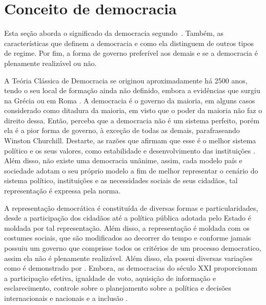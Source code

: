 \section{Conceito de democracia} \label{democracia}


Esta seção aborda o significado da democracia segundo~\cite{robertdahl2001}.
Também, as características que definem a democracia e como ela distinguem de outros tipos de regime. 
Por fim, a forma de governo preferível aos demais e se a democracia é plenamente realizável ou não.


A Teória Clássica de Democracia se originou aproximadamente há 2500 anos, tendo o seu local de formação ainda não definido, embora a evidências que surgiu na Grécia ou em Roma \cite{matias2014curso}.
A democracia é o governo da maioria, em alguns casos considerado como ditadura da maioria, em visto que o poder da maioria não faz o direito dessa. 
Então, perceba que a democracia não é um sistema perfeito, porém ela é a pior forma de governo, à exceção de todas as demais, parafraseando Winston Churchill.
Destarte, as razões que afirmam que esse é o melhor sistema político e os seus valores, como estabilidade e desenvolvimento das instituições \cite{robertdahl2001}.
Além disso, não existe uma democracia unânime, assim, cada modelo país e sociedade adotam o seu próprio modelo a fim de melhor representar o cenário do sistema político, instituições e as necessidades sociais de seus cidadãos, tal representação é expressa pela norma\cite{bobbio1998dicionario}.

A representação democrática é constituída de diversas formas e particularidades, desde a participação dos cidadãos até a política pública adotada pelo Estado é moldada por tal representação.
Além disso, a representação é moldada com os costumes sociais, que são modificados ao decorrer do tempo e conforme  jamais possuiu um governo que comprisse todos os critérios de um processo democratico, assim ela não é plenamente realizável.
Além disso, ela possui diversas variações como é demonstrado por . 
Embora, as democracias do século XXI proporcionam a participação efetiva, igualdade de voto, aquisição de informação e esclarecimento, controle sobre o planejamento sobre a política e decisões internacionais e nacionais e a inclusão \cite{robertdahl2001}.


